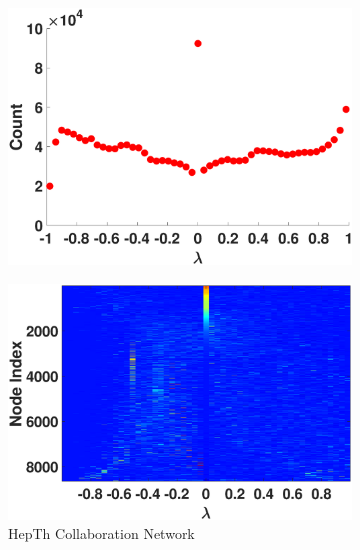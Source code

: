 \begin{figure}[ht]
\begin{subfigure}[t]{0.19\textwidth}
    \includegraphics[width=\textwidth,trim = .4cm 0.5cm 3.5cm .3cm,clip]
    {./ndos/pics/roadca}
    \label{fig:roadca_dos}
  \end{subfigure}
  \begin{subfigure}[t]{0.19\textwidth}
    \centering  
    \captionsetup{justification=centering,font=scriptsize}
    \includegraphics[width=\textwidth,trim = .4cm 0.5cm 3.5cm 1.3cm,clip]
    {./ndos/pics/hepth_ldos}
    \caption{HepTh Collaboration Network}
    \label{fig:hepth_ldos}
  \end{subfigure}
  \begin{subfigure}[t]{0.19\textwidth}
    \centering  
    \captionsetup{justification=centering,font=scriptsize}

\end{subfigure}
\end{figure}

